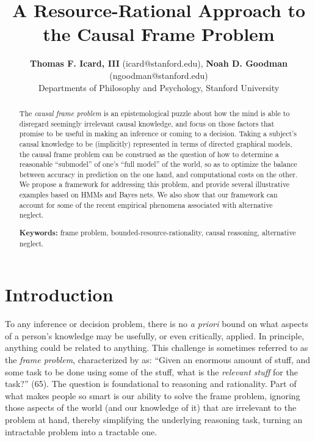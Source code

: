 \documentclass[10pt,letterpaper]{article}
\title{A Resource-Rational Approach to the Causal Frame Problem}
\author{{\large \bf Thomas F. Icard, III} (icard@stanford.edu), {\large \bf Noah D. Goodman} (ngoodman@stanford.edu)\\
  Departments of Philosophy and Psychology, Stanford University}
\begin{document}
\maketitle


\begin{abstract}
The \emph{causal frame problem} is an epistemological puzzle about how the mind is able to disregard seemingly irrelevant causal knowledge, and focus on those factors that promise to be useful in making an inference or coming to a decision. Taking a subject's causal knowledge to be (implicitly) represented in terms of directed graphical models, the causal frame problem can be construed as the question of how to determine a reasonable ``submodel'' of one's ``full model'' of the world, so as to optimize the balance between accuracy in prediction on the one hand, and computational costs on the other. We propose a framework for addressing this problem, and provide several illustrative examples based on HMMs and Bayes nets. We also show that our framework can account for some of the recent empirical phenomena associated with alternative neglect.

\textbf{Keywords:} 
frame problem, bounded-resource-rationality, causal reasoning, alternative neglect.
\end{abstract}

\section{Introduction}

To any inference or decision problem, there is no \emph{a priori} bound on what aspects of a person's knowledge may be usefully, or even critically, applied. In principle, anything could be related to anything. 
This challenge is sometimes referred to as the \emph{frame problem}, characterized by \cite{Glymour1987} as: ``Given an enormous amount of stuff, and some task to be done using some of the stuff, what is the \emph{relevant stuff} for the task?'' (65). The question is foundational to reasoning and rationality. 
Part of what makes people so smart is our ability to solve the frame problem, ignoring those aspects of the world (and our knowledge of it) that are irrelevant to the problem at hand, thereby simplifying the underlying reasoning task, turning an intractable problem into a tractable one.
\end{document}
